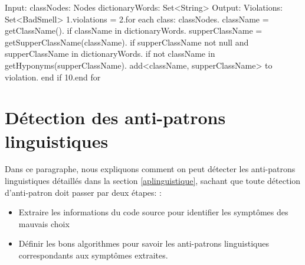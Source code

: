 \begin{enumerate}
	\begin{framed}
  {\selectfont  
 Input:\newline
 classNodes: Nodes\newline
 dictionaryWords: Set<String>\newline
 Output:\newline
 Violations: Set<BadSmell>\newline
 1.violations = \newline
 2.for each class: classNodes.	className = getClassName().	if className in dictionaryWords.		supperClassName = getSupperClassName(className).		if supperClassName not null and supperClassName in dictionaryWords.			if not className in getHyponyms(supperClassName).				add<className, supperClassName> to violation.     end if\newline
 10.end for\newline
}
\end{framed}
\end{enumerate}
\section{Détection des anti-patrons linguistiques}
Dans ce paragraphe, nous expliquons comment on peut détecter les anti-patrons linguistiques détaillés dans la section \ref{aplinguistique}, sachant que 
toute détection d’anti-patron doit passer par deux étapes: \cite{brown1998antipatterns}:
\begin{itemize}
    

\item Extraire les informations du code source pour identifier les symptômes des mauvais choix
\item Définir les bons algorithmes pour savoir les anti-patrons linguistiques correspondants aux symptômes extraites.
\end{itemize}

